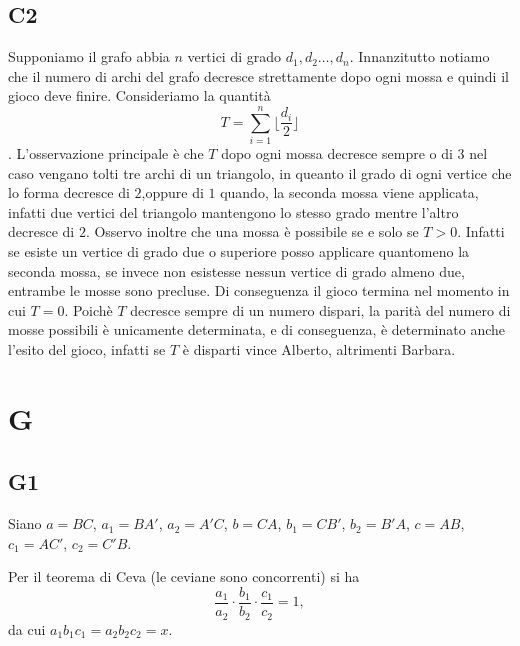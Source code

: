 \documentclass[11pt]{scrartcl}
\begin{document}
\subsection{C2}
Supponiamo il grafo abbia $n$ vertici di grado $d_1,d_2 \ldots , d_n$. Innanzitutto
notiamo che il numero di archi del grafo decresce strettamente dopo ogni mossa e
quindi il gioco deve finire. Consideriamo la quantità
\[T = \sum_{i=1}^{n} \lfloor \frac{d_i}{2} \rfloor\].
L'osservazione principale è che $T$ dopo ogni mossa decresce sempre o
 di $3$ nel caso vengano tolti tre archi di un triangolo, in queanto il grado
 di ogni vertice che lo forma decresce di $2$,oppure di $1$ quando, la seconda
 mossa viene applicata, infatti due vertici del triangolo mantengono lo stesso
 grado mentre l'altro decresce di $2$. Osservo inoltre che una mossa è possibile
 se e solo se $T>0$. Infatti se esiste un vertice di grado due o superiore posso
 applicare quantomeno la seconda mossa, se invece non esistesse nessun vertice di
 grado almeno due, entrambe le mosse sono precluse. Di conseguenza il gioco termina
 nel momento in cui $T=0$. Poichè $T$ decresce sempre di un numero dispari,
 la parità del numero di mosse possibili è unicamente determinata, e di conseguenza,
 è determinato anche l'esito del gioco, infatti se $T$ è disparti vince Alberto,
 altrimenti Barbara.

\section{G}

\subsection{G1}
Siano $a=BC$, $a_1=BA'$, $a_2=A'C$, $b=CA$, $b_1=CB'$, $b_2=B'A$, $c=AB$, $c_1=AC'$, $c_2=C'B$.

Per il teorema di Ceva (le ceviane sono concorrenti) si ha
\[
\frac{a_1}{a_2}\cdot\frac{b_1}{b_2}\cdot\frac{c_1}{c_2}=1,
\]
da cui $a_1 b_1 c_1=a_2 b_2 c_2=x$.
\end{document}
